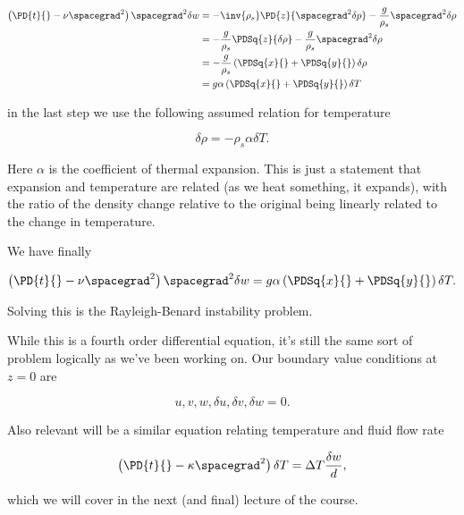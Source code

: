 \begin{align*}
\left( \PD{t}{} - \nu \spacegrad^2 \right) \spacegrad^2 \delta w 
&= -\inv{\rho_s} \PD{z}{ \spacegrad^2 \delta p} - \frac{g}{\rho_s} \spacegrad^2 \delta \rho \\
&= -\frac{g}{\rho_s} \PDSq{z}{\delta \rho} - \frac{g}{\rho_s} \spacegrad^2 \delta \rho \\
&= 
-\frac{g}{\rho_s} \left( 
\PDSq{x}{}
+\PDSq{y}{}
\right)
\delta \rho \\
&=
g \alpha \left( 
\PDSq{x}{}
+\PDSq{y}{}
\right)
\delta T
\end{align*}

in the last step we use the following assumed relation for temperature

\begin{equation}\label{eqn:continuumL21:250}
\delta \rho = - \rho_s \alpha \delta T.
\end{equation}

Here $\alpha$ is the coefficient of thermal expansion.  This is just a statement that expansion and temperature are related (as we heat something, it expands), with the ratio of the density change relative to the original being linearly related to the change in temperature.

We have finally

\begin{equation}\label{eqn:continuumL21:290}
\left( \PD{t}{} - \nu \spacegrad^2 \right) \spacegrad^2 \delta w 
= 
g \alpha \left( 
\PDSq{x}{}
+\PDSq{y}{}
\right)
\delta T.
\end{equation}

Solving this is the Rayleigh-Benard instability problem.

While this is a fourth order differential equation, it's still the same sort of problem logically as we've been working on.  Our boundary value conditions at $z = 0$ are

\begin{equation}\label{eqn:continuumL21:n}
u, v, w, \delta u, \delta v, \delta w = 0.
\end{equation}

Also relevant will be a similar equation relating temperature and fluid flow rate

\begin{equation}\label{eqn:continuumL21:270}
\left( \PD{t}{} - \kappa \spacegrad^2 \right) \delta T = \Delta T \frac{\delta w}{d},
\end{equation}

which we will cover in the next (and final) lecture of the course.


\EndNoBibArticle
